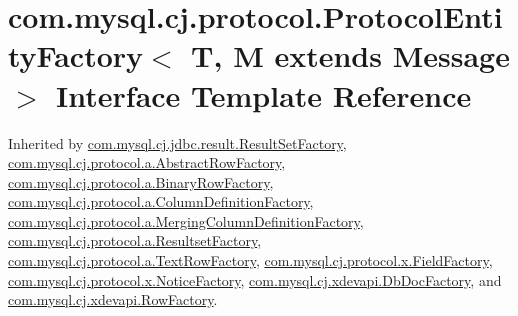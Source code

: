 \hypertarget{interfacecom_1_1mysql_1_1cj_1_1protocol_1_1_protocol_entity_factory}{}\section{com.\+mysql.\+cj.\+protocol.\+Protocol\+Entity\+Factory$<$ T, M extends Message $>$ Interface Template Reference}
\label{interfacecom_1_1mysql_1_1cj_1_1protocol_1_1_protocol_entity_factory}


Inherited by \mbox{\hyperlink{classcom_1_1mysql_1_1cj_1_1jdbc_1_1result_1_1_result_set_factory}{com.\+mysql.\+cj.\+jdbc.\+result.\+Result\+Set\+Factory}}, \mbox{\hyperlink{classcom_1_1mysql_1_1cj_1_1protocol_1_1a_1_1_abstract_row_factory}{com.\+mysql.\+cj.\+protocol.\+a.\+Abstract\+Row\+Factory}}, \mbox{\hyperlink{classcom_1_1mysql_1_1cj_1_1protocol_1_1a_1_1_binary_row_factory}{com.\+mysql.\+cj.\+protocol.\+a.\+Binary\+Row\+Factory}}, \mbox{\hyperlink{classcom_1_1mysql_1_1cj_1_1protocol_1_1a_1_1_column_definition_factory}{com.\+mysql.\+cj.\+protocol.\+a.\+Column\+Definition\+Factory}}, \mbox{\hyperlink{classcom_1_1mysql_1_1cj_1_1protocol_1_1a_1_1_merging_column_definition_factory}{com.\+mysql.\+cj.\+protocol.\+a.\+Merging\+Column\+Definition\+Factory}}, \mbox{\hyperlink{classcom_1_1mysql_1_1cj_1_1protocol_1_1a_1_1_resultset_factory}{com.\+mysql.\+cj.\+protocol.\+a.\+Resultset\+Factory}}, \mbox{\hyperlink{classcom_1_1mysql_1_1cj_1_1protocol_1_1a_1_1_text_row_factory}{com.\+mysql.\+cj.\+protocol.\+a.\+Text\+Row\+Factory}}, \mbox{\hyperlink{classcom_1_1mysql_1_1cj_1_1protocol_1_1x_1_1_field_factory}{com.\+mysql.\+cj.\+protocol.\+x.\+Field\+Factory}}, \mbox{\hyperlink{classcom_1_1mysql_1_1cj_1_1protocol_1_1x_1_1_notice_factory}{com.\+mysql.\+cj.\+protocol.\+x.\+Notice\+Factory}}, \mbox{\hyperlink{classcom_1_1mysql_1_1cj_1_1xdevapi_1_1_db_doc_factory}{com.\+mysql.\+cj.\+xdevapi.\+Db\+Doc\+Factory}}, and \mbox{\hyperlink{classcom_1_1mysql_1_1cj_1_1xdevapi_1_1_row_factory}{com.\+mysql.\+cj.\+xdevapi.\+Row\+Factory}}.

